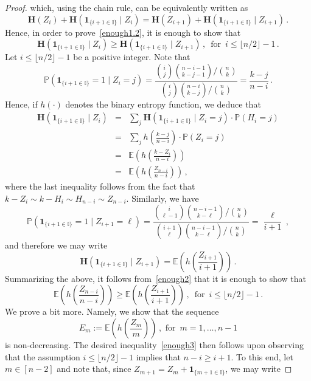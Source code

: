 \documentclass[11pt]{article}
\newcommand{\Prb}{\mathbb{P}}
\newcommand{\Exp}{\mathbb{E}}
\newcommand{\bh}{\mathbf{H}}
\begin{document}
\begin{proof}
which, using the chain rule, can be equivalently written as 
\[
\bh(Z_i) + \bh(\mathbf{1}_{\{i+1\in \mathbb{I}\}}\mid Z_i) = 
\bh(Z_{i+1}) + \bh(\mathbf{1}_{\{i+1\in \mathbb{I}\}}\mid Z_{i+1}) \, .
\]
Hence, in order to prove~\eqref{enough1.2}, it is enough to show that 
\begin{equation}\label{enough2}
\bh(\mathbf{1}_{\{i+1\in \mathbb{I}\}}\mid Z_i) \ge \bh(\mathbf{1}_{\{i+1\in \mathbb{I}\}}\mid Z_{i+1}) \, , \, \text{ for } \, i \le \lfloor n/2\rfloor -1 \, .
\end{equation}
Let $i\le \lfloor n/2\rfloor -1$ be a positive integer. Note that 
\[
\Prb(\mathbf{1}_{\{i+1\in\mathbb{I}\}}=1 \mid Z_i = j)= \frac{\binom{i}{j}\binom{n-i-1}{k-j-1}/\binom{n}{k}}{\binom{i}{j}\binom{n-i}{k-j}/\binom{n}{k} }
= \frac{k-j}{n-i} \, .
\]
Hence, if  $h(\cdot)$ denotes the binary entropy function, we deduce that
\begin{eqnarray*}
\bh(\mathbf{1}_{\{i+1\in \mathbb{I}\}}\mid Z_i) &=& \sum_{j} \bh(\mathbf{1}_{\{i+1\in \mathbb{I}\}}\mid Z_i=j) \cdot \Prb(H_i=j)\\
&=& \sum_{j} h\left( \frac{k-j}{n-i}\right) \cdot \Prb(Z_i=j) \\
&=& \Exp\left(h\left(\frac{k-Z_i}{n-i} \right) \right) \\
&=& \Exp\left(h\left(\frac{Z_{n-i}}{n-i} \right) \right) \, ,
\end{eqnarray*}
where the last inequality follows from the fact that $k-Z_i\sim k-H_i\sim H_{n-i}\sim Z_{n-i}$. 
Similarly, we have 
\[
\Prb(\mathbf{1}_{\{i+1\in\mathbb{I}\}}=1 \mid Z_{i+1} = \ell)= \frac{\binom{i}{\ell-1}\binom{n-i-1}{k-\ell}/\binom{n}{k}}{\binom{i+1}{\ell}\binom{n-i-1}{k-\ell}/\binom{n}{k} }
= \frac{\ell}{i+1} \, , 
\]
and therefore we may write 
\[
\bh(\mathbf{1}_{\{i+1\in \mathbb{I}\}}\mid Z_{i+1}) = \Exp\left(h\left(\frac{Z_{i+1}}{i+1}\right)\right) \, .
\]
Summarizing the above, it follows from~\eqref{enough2} that it is enough to show that 
\begin{equation}\label{enough3}
\Exp\left(h\left(\frac{Z_{n-i}}{n-i} \right) \right) \ge \Exp\left(h\left(\frac{Z_{i+1}}{i+1}\right)\right) \, , \, \text{ for } \, i \le \lfloor n/2\rfloor -1 \, .
\end{equation}
We prove a bit more. Namely, we show that the sequence 
\[
E_m := \Exp\left(h\left(\frac{Z_{m}}{m}\right)\right) \, , \text{ for } \, m=1,\ldots,n-1
\]
is non-decreasing. The desired inequality~\eqref{enough3} then follows upon observing that the assumption $i \le \lfloor n/2\rfloor -1$ implies that $n-i\ge i+1$. To this end, let $m\in [n-2]$ and note that, since $Z_{m+1} = Z_m + \mathbf{1}_{\{m+1\in \mathbb{I}\}}$, we may write 

\end{proof}
\end{document}
